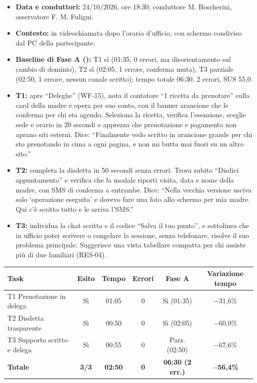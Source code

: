 \begin{itemize}
\item \textbf{Data e conduttori:} 24/10/2026, ore 18:30; conduttore M. Boscherini, osservatore F. M. Fuligni.
\item \textbf{Contesto:} in videochiamata dopo l'orario d'ufficio, con schermo condiviso dal PC della partecipante.
\item \textbf{Baseline di Fase A ():} T1 sì (01:35, 0 errori, ma disorientamento sul cambio di dominio), T2 sì (02:05, 1 errore, conferma muta), T3 parziale (02:50, 1 errore, nessun canale scritto); tempo totale 06:30, 2 errori, SUS 55,0.
\end{itemize}


\begin{itemize}
\item \textbf{T1:} apre ``Deleghe'' (WF-15), nota il contatore ``1 ricetta da prenotare'' sulla card della madre e opera per suo conto, con il banner arancione che le conferma per chi sta agendo. Seleziona la ricetta, verifica l'esenzione, sceglie sede e orario in 20 secondi e apprezza che prenotazione e pagamento non aprano siti esterni. Dice: \enquote{Finalmente vedo scritto in arancione grande per chi sto prenotando in cima a ogni pagina, e non mi butta mai fuori su un altro sito.}
\item \textbf{T2:} completa la disdetta in 50 secondi senza errori. Trova subito ``Disdici appuntamento'' e verifica che la modale riporti visita, data e nome della madre, con SMS di conferma a entrambe. Dice: \enquote{Nella vecchia versione usciva solo `operazione eseguita' e dovevo fare una foto allo schermo per mia madre. Qui c'è scritto tutto e le arriva l'SMS.}
\item \textbf{T3:} individua la chat scritta e il codice ``Salva il tuo punto'', e sottolinea che in ufficio poter scrivere o congelare la sessione, senza telefonare, risolve il suo problema principale. Suggerisce una vista tabellare compatta per chi assiste più di due familiari (RES-04).
\end{itemize}

\begin{center}
\label{tab:d-test-silvia}
\footnotesize
\begin{tabularx}{\linewidth}{@{}>{\raggedright\arraybackslash}X c c c c c@{}}
\toprule
\textbf{Task} & \textbf{Esito} & \textbf{Tempo} & \textbf{Errori} & \textbf{Fase A} & \textbf{Variazione tempo} \\
\midrule
T1 Prenotazione in delega & Sì & 01:05 & 0 & Sì (01:35) & $-$31,6\% \\
T2 Disdetta trasparente & Sì & 00:50 & 0 & Sì (02:05) & $-$60,0\% \\
T3 Supporto scritto e delega & Sì & 00:55 & 0 & Parz. (02:50) & $-$67,6\% \\
\midrule
\textbf{Totale} & \textbf{3/3} & \textbf{02:50} & \textbf{0} & \textbf{06:30 (2 err.)} & \textbf{$-$56,4\%} \\
\bottomrule
\end{tabularx}
\end{center}


